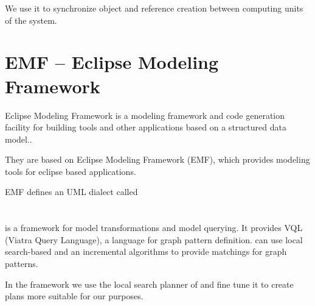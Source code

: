 We use it to synchronize object and reference creation between computing units of the system.


\section{EMF -- Eclipse Modeling Framework}

Eclipse Modeling Framework is a modeling framework and code generation facility for building tools and other applications based on a structured data model.\cite{emf}.



They are based on Eclipse Modeling Framework (EMF), which provides modeling tools for eclipse based applications.

EMF defines an UML dialect called


\section{\protect\viatra{} }


\viatra{} \cite{viatra} is a framework for model transformations and model querying. 
It provides VQL (Viatra Query Language), a language for graph pattern definition.
\viatra{} can use local search-based and an incremental algorithms to provide matchings for graph patterns. 

In the framework we use the local search planner of \viatra{} and fine tune it to create plans more suitable for our purposes.









